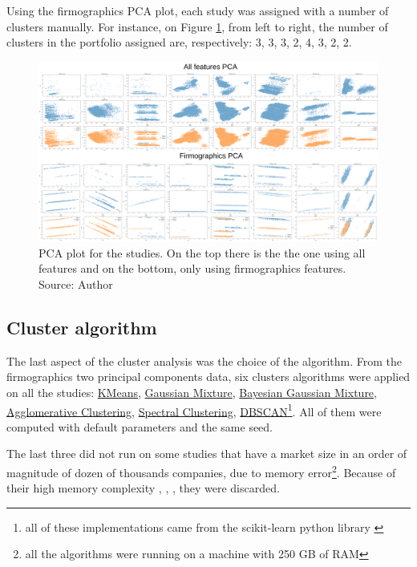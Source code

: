 Using the firmographics PCA plot, each study was assigned with a number of clusters manually. For instance, on Figure \ref{fig:pca-plot}, from left to right, the number of clusters in the portfolio assigned are, respectively: 3, 3, 3, 2, 4, 3, 2, 2.  

\begin{figure}[h]
   \centering
   \includegraphics[width=\linewidth]{fig/ch3-pca-plot.png}
   \caption{PCA plot for the studies. On the top there is the the one using all features and on the bottom, only using firmographics features. Source: Author}
   \label{fig:pca-plot}
\end{figure}

\subsection{Cluster algorithm}
\label{ch:cluster-algorithm}

The last aspect of the cluster analysis was the choice of the algorithm. From the firmographics two principal components data, six clusters algorithms were applied on all the studies: \underline{KMeans}, \underline{Gaussian Mixture}, \underline{Bayesian Gaussian Mixture}, \underline{Agglomerative Clustering}, \underline{Spectral Clustering}, \underline{DBSCAN}\footnote{all of these implementations came from the scikit-learn python library \cite{scikit-learn}}. All of them were computed with default parameters and the same seed.

The last three did not run on some studies that have a market size in an order of magnitude of dozen of thousands companies, due to memory error\footnote{all the algorithms were running on a machine with 250 GB of RAM}. Because of their high memory complexity \cite{franti2006fast}, \cite{ester1996density}, \cite{yan2009fast}, they were discarded.

